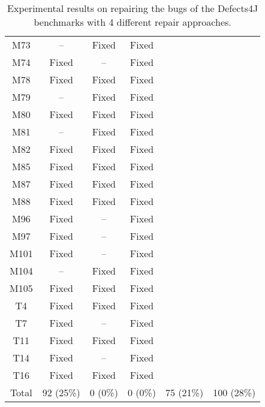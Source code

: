 \begin{table}[!t]
{\begin{tabular}{|c|c|c|c|c|c|}
M73               & --        & Fixed     &Fixed   \\
M74               & Fixed     & --        &Fixed   \\
M78               & Fixed     & Fixed     &Fixed   \\
M79               & --        & Fixed     &Fixed   \\
M80               & Fixed     & Fixed     &Fixed   \\
M81               & --        & Fixed     &Fixed   \\
M82               & Fixed     & Fixed     &Fixed   \\
M85               & Fixed     & Fixed     &Fixed   \\
M87               & Fixed     & Fixed     &Fixed   \\
M88               & Fixed     & Fixed     &Fixed   \\
M96               & Fixed     & --        &Fixed   \\
M97               & Fixed     & --        &Fixed   \\
M101              & Fixed     & --        &Fixed   \\
M104              & --        & Fixed     &Fixed   \\
M105              & Fixed     & Fixed     &Fixed   \\
\hline
T4                & Fixed     & Fixed     &Fixed   \\
T7                & Fixed     & --        &Fixed   \\
T11               & Fixed     & Fixed     &Fixed   \\
T14               & Fixed     & --        &Fixed   \\
T16               & Fixed     & Fixed     &Fixed   \\
\hline
Total             & 92 (25\%) & 0 (0\%)   & 0 (0\%)   & 75 (21\%) & 100 (28\%)\\
\hline 
\end{tabular}%
}
\caption{Experimental results on repairing the bugs of the Defects4J benchmarks with 4 different repair approaches.}
\end{table}
